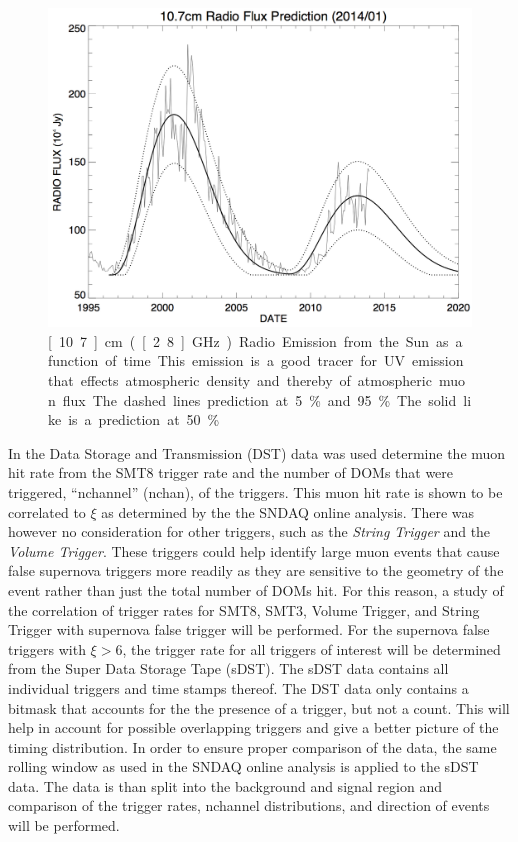 \begin{figure}[h]
  \begin{center}
    \includegraphics[width=1\textwidth]{./figures/sunradiofluxmeasuredpredict.png}
  \end{center}
  \caption{\unit[10.7]{cm} (\unit[2.8]{GHz}) Radio Emission from the Sun as a function of time. This emission is a good tracer for UV emission that effects atmospheric density and thereby of atmospheric muon flux. The dashed lines prediction at 5\% and 95\%. The solid like is a prediction at 50\%. \cite{solaractivity} \label{fig:solarcycle}}   
\end{figure}

In \cite{vbaumaster} the Data Storage and Transmission (DST) data was used determine the muon hit rate from the SMT8 trigger rate and the number of DOMs that were triggered, ``nchannel'' (nchan), of the triggers. This muon hit rate is shown to be correlated to $\xi$ as determined by the the SNDAQ online analysis. There was however no consideration for other triggers, such as the \emph{String Trigger} and the \emph{Volume Trigger}. These triggers could help identify large muon events that cause false supernova triggers more readily as they are sensitive to the geometry of the event rather than just the total number of DOMs hit. For this reason, a study of the correlation of trigger rates for SMT8, SMT3, Volume Trigger, and String Trigger with supernova false trigger will be performed. For the supernova false triggers with $\xi > 6$, the trigger rate for all triggers of interest will be determined from the Super Data Storage Tape (sDST). The sDST data contains all individual triggers and time stamps thereof. The DST data only contains a bitmask that accounts for the the presence of a trigger, but not a count. This will help in account for possible overlapping triggers and give a better picture of the timing distribution. In order to ensure proper comparison of the data, the same rolling window as used in the SNDAQ online analysis is applied to the sDST data. The data is than split into the background and signal region and comparison of the trigger rates, nchannel distributions, and direction of events will be performed.

